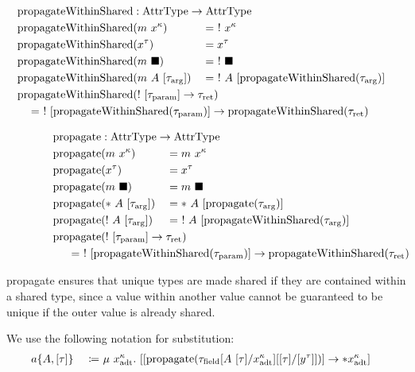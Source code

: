 \newcommand{\propagateWithinShared}{\mathrm{propagateWithinShared}}

\begin{alignat*}{3}
  \propagateWithinShared &: \mathrlap{\AttrType \to \AttrType} \\
  \propagateWithinShared&(m\ x^\kappa) &&=\ !\ x^\kappa \\
  \propagateWithinShared&(x^\tau) &&= x^\tau \\
  \propagateWithinShared&(m\ \blacksquare) &&=\ !\ \blacksquare \\
  \propagateWithinShared&(m\ A\ [\tau_\arrg]) &&=\ !\ A\ [\propagateWithinShared(\tau_\arrg)] \\
  \propagateWithinShared&\mathrlap{(!\ [\tau_\param] \to \tau_\ret)} \\
  \mathclap{\hspace{12em}= \ !\ [\propagateWithinShared(\tau_\param)] \to \propagateWithinShared(\tau_\ret)}
\end{alignat*}

\newcommand{\propagate}{\mathrm{propagate}}

\begin{alignat*}{3}
  \propagate &: \mathrlap{\AttrType \to \AttrType} \\
  \propagate&(m\ x^\kappa) &&= m\ x^\kappa \\
  \propagate&(x^\tau) &&= x^\tau \\
  \propagate&(m\ \blacksquare) &&= m\ \blacksquare \\
  \propagate&(*\ A\ [\tau_\arrg]) &&= *\ A\ [\propagate(\tau_\arrg)] \\
  \propagate&(!\ A\ [\tau_\arrg]) &&= \ !\ A\ [\propagateWithinShared(\tau_\arrg)] \\
  \propagate&\mathrlap{(!\ [\tau_\param] \to \tau_\ret)} \\
  \mathclap{\hspace{25em}= \ !\ [\propagateWithinShared(\tau_\param)] \to \propagateWithinShared(\tau_\ret)}
\end{alignat*}

propagate ensures that unique types are made shared if they are contained within a shared type, since a value within another value cannot be guaranteed to be unique if the outer value is already shared. 

We use the following notation for substitution:
\begin{alignat*}{3}
	a\{A, [\tau]\}\ &&\coloneqq&\ \mu\ x^\kappa_\adt.\ [[\propagate(\tau_\field[A\ [\tau]/x^\kappa_\adt][[\tau]/[y^\tau]])] \to *x^\kappa_\adt]
\end{alignat*}

